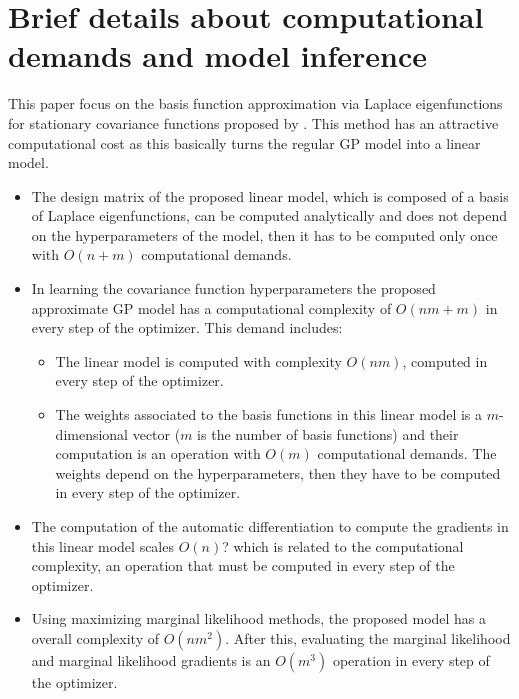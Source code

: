 \documentclass[onecolumn,a4paper,11pt]{article}
\begin{document}
\section{Brief details about computational demands and model inference}

This paper focus on the basis function approximation via Laplace eigenfunctions for stationary covariance functions proposed by \citet{solin2018hilbert}. This method has an attractive computational cost as this basically turns the regular GP model into a linear model.

\vspace{2mm}
\begin{itemize}
	\item The design matrix of the proposed linear model, which is composed of a basis of Laplace eigenfunctions, can be computed analytically and does not depend on the hyperparameters of the model, then it has to be computed only once with $O(n+m)$ computational demands.
	
	\item In learning the covariance function hyperparameters the proposed approximate GP model has a computational complexity of $O(nm+m)$ in every step of the optimizer. This demand includes:
	
	\begin{itemize}
		\item The linear model is computed with complexity $O(nm)$, computed in every step of the optimizer.

		\item The weights associated to the basis functions in this linear model is a $m$-dimensional vector ($m$ is the number of basis functions) and their computation is an operation with $O(m)$ computational demands. The weights depend on the hyperparameters, then they have to be computed in every step of the optimizer.
	\end{itemize}
	
	\item The computation of the automatic differentiation to compute the gradients in this linear model scales $O(n)$? which is related to the computational complexity, an operation that must be computed in every step of the optimizer.
	
	\item Using maximizing marginal likelihood methods, the proposed model has a overall complexity of $O(nm^2)$. After this, evaluating the marginal likelihood and marginal likelihood gradients is an $O(m^3)$ operation in every step of the optimizer.


\end{itemize}
\end{document}
